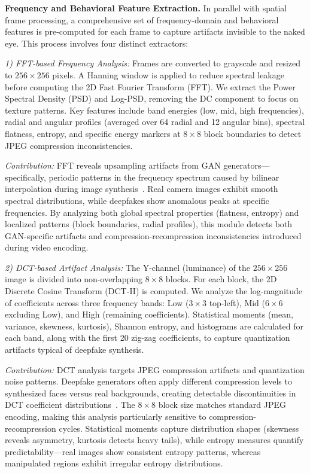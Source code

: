 \documentclass[conference]{IEEEtran}
\begin{document}
\textbf{Frequency and Behavioral Feature Extraction.} In parallel with spatial frame processing, a comprehensive set of frequency-domain and behavioral features is pre-computed for each frame to capture artifacts invisible to the naked eye. This process involves four distinct extractors:

\textit{1) FFT-based Frequency Analysis:} Frames are converted to grayscale and resized to $256 \times 256$ pixels. A Hanning window is applied to reduce spectral leakage before computing the 2D Fast Fourier Transform (FFT). We extract the Power Spectral Density (PSD) and Log-PSD, removing the DC component to focus on texture patterns. Key features include band energies (low, mid, high frequencies), radial and angular profiles (averaged over 64 radial and 12 angular bins), spectral flatness, entropy, and specific energy markers at $8 \times 8$ block boundaries to detect JPEG compression inconsistencies.

\textit{Contribution:} FFT reveals upsampling artifacts from GAN generators—specifically, periodic patterns in the frequency spectrum caused by bilinear interpolation during image synthesis~\cite{b5}. Real camera images exhibit smooth spectral distributions, while deepfakes show anomalous peaks at specific frequencies. By analyzing both global spectral properties (flatness, entropy) and localized patterns (block boundaries, radial profiles), this module detects both GAN-specific artifacts and compression-recompression inconsistencies introduced during video encoding.

\textit{2) DCT-based Artifact Analysis:} The Y-channel (luminance) of the $256 \times 256$ image is divided into non-overlapping $8 \times 8$ blocks. For each block, the 2D Discrete Cosine Transform (DCT-II) is computed. We analyze the log-magnitude of coefficients across three frequency bands: Low ($3 \times 3$ top-left), Mid ($6 \times 6$ excluding Low), and High (remaining coefficients). Statistical moments (mean, variance, skewness, kurtosis), Shannon entropy, and histograms are calculated for each band, along with the first 20 zig-zag coefficients, to capture quantization artifacts typical of deepfake synthesis.

\textit{Contribution:} DCT analysis targets JPEG compression artifacts and quantization noise patterns. Deepfake generators often apply different compression levels to synthesized faces versus real backgrounds, creating detectable discontinuities in DCT coefficient distributions~\cite{b9}. The $8 \times 8$ block size matches standard JPEG encoding, making this analysis particularly sensitive to compression-recompression cycles. Statistical moments capture distribution shapes (skewness reveals asymmetry, kurtosis detects heavy tails), while entropy measures quantify predictability—real images show consistent entropy patterns, whereas manipulated regions exhibit irregular entropy distributions.
\end{document}
